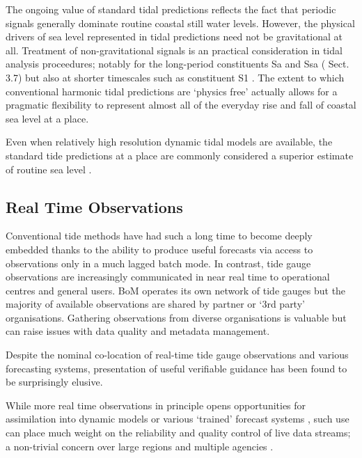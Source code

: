\documentclass[jmse,article,accept,moreauthors,pdftex,10pt,a4paper]{mdpi}
\begin{document}
The ongoing value of standard tidal predictions reflects the fact that periodic signals generally dominate routine coastal still water levels.
However, the physical drivers of sea level represented in tidal predictions need not be gravitational at all.
Treatment of non-gravitational signals is an practical consideration in tidal analysis proceedures; notably for the long-period constituents Sa and Ssa (\cite[]{Parker:2007wq} Sect. 3.7) but also at shorter timescales such as constituent S1 \cite{Ray:2004ts}.
The extent to which conventional harmonic tidal predictions are `physics free' actually allows for a pragmatic flexibility to represent almost all of the everyday rise and fall of coastal sea level at a place.

Even when relatively high resolution dynamic tidal models are available, the standard tide predictions at a place are commonly considered a superior estimate of routine sea level \cite{Horsburgh:2008gw,Egbert:1996vr}.


\subsection{Real Time Observations}
Conventional tide methods have had such a long time to become deeply embedded \cite{Cartwright:2000tt} thanks to the ability to produce useful forecasts via access to observations only in a much lagged batch mode.  
In contrast, tide gauge observations are increasingly communicated in near real time to operational centres and general users. 
BoM operates its own network of tide gauges \cite{Greenslade:2012um} but the majority of available observations are shared by partner or `3rd party' organisations. 
Gathering observations from diverse organisations is valuable but can raise issues with data quality and metadata management.

Despite the nominal co-location of real-time tide gauge observations and various forecasting systems, presentation of useful verifiable guidance has been found to be surprisingly elusive.     

While more real time observations in principle opens opportunities for assimilation into dynamic models or various `trained' forecast systems \cite{Horsburgh:2011th}, such use can place much weight on the reliability and quality control of live data streams; a non-trivial concern over large regions and multiple agencies \cite{Mourre:2006hz}.


\end{document}
